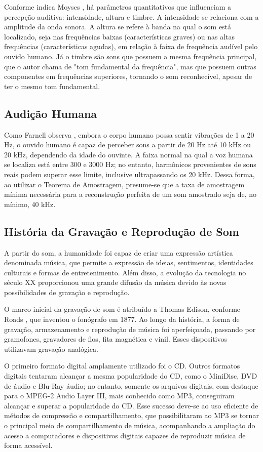 Conforme indica Moyses \cite{moyses}, há parâmetros quantitativos que influenciam a percepção auditiva: intensidade, altura e timbre. A intensidade se relaciona com a amplitude da onda sonora. A altura se refere à banda na qual o som está localizado, seja nas frequências baixas (características graves) ou nas altas frequências (características agudas), em relação à faixa de frequência audível pelo ouvido humano. Já o timbre são sons que possuem a mesma frequência principal, que o autor chama de "tom fundamental da frequência", mas que possuem outras componentes em frequências superiores, tornando o som reconhecível, apesar de ter o mesmo tom fundamental.

\subsection{Audição Humana}
Como Farnell observa \cite{farnell}, embora o corpo humano possa sentir vibrações de 1 a 20 Hz, o ouvido humano é capaz de perceber sons a partir de 20 Hz até 10 kHz ou 20 kHz, dependendo da idade do ouvinte. A faixa normal na qual a voz humana se localiza está entre 300 e 3000 Hz; no entanto, harmônicos provenientes de sons reais podem superar esse limite, inclusive ultrapassando os 20 kHz. Dessa forma, ao utilizar o Teorema de Amostragem, presume-se que a taxa de amostragem mínima necessária para a reconstrução perfeita de um som amostrado seja de, no mínimo, 40 kHz.

\subsection{História da Gravação e Reprodução de Som}
A partir do som, a humanidade foi capaz de criar uma expressão artística denominada música, que permite a expressão de ideias, sentimentos, identidades culturais e formas de entretenimento. Além disso, a evolução da tecnologia no século XX proporcionou uma grande difusão da música devido às novas possibilidades de gravação e reprodução. \par
O marco inicial da gravação de som é atribuído a Thomas Edison, conforme Roads \cite{roads1996computer}, que inventou o fonógrafo em 1877. Ao longo da história, a forma de gravação, armazenamento e reprodução de música foi aperfeiçoada, passando por gramofones, gravadores de fios, fita magnética e vinil. Esses dispositivos utilizavam gravação analógica. \par
O primeiro formato digital amplamente utilizado foi o CD. Outros formatos digitais tentaram alcançar a mesma popularidade do CD, como o MiniDisc, DVD de áudio e Blu-Ray áudio; no entanto, somente os arquivos digitais, com destaque para o MPEG-2 Audio Layer III, mais conhecido como MP3, conseguiram alcançar e superar a popularidade do CD. Esse sucesso deve-se ao uso eficiente de métodos de compressão e compartilhamento, que possibilitaram ao MP3 se tornar o principal meio de compartilhamento de música, acompanhando a ampliação do acesso a computadores e dispositivos digitais capazes de reproduzir música de forma acessível.

